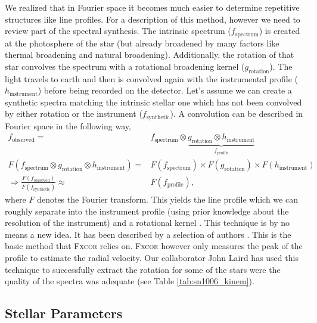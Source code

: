 We realized that in Fourier space it becomes much easier to determine repetitive  structures like line profiles. For a description of this method, however we need to review part of the spectral synthesis. The intrinsic spectrum ($f_\textrm{spectrum}$) is created at the photosphere of the star (but already broadened by many factors like thermal broadening and natural broadening). Additionally, the rotation of that star convolves the spectrum with a rotational broadening kernel ($g_\textrm{rotation}$). The light travels to earth and then is convolved again with the instrumental profile ($h_\textrm{instrument}$) before being recorded on the detector.  Let's assume we can create a synthetic spectra matching the intrinsic stellar one which has not been convolved by either rotation or the instrument ($f_\textrm{synthetic}$). A convolution can be described in Fourier space in the following way,
\begin{align*}
	f_\textrm{observed} =& f_\textrm{spectrum} \otimes \underbrace{g_\textrm{rotation} \otimes h_\textrm{instrument}}_{f_\textrm{profile}}\\
     F(f_\textrm{spectrum} \otimes g_\textrm{rotation} \otimes h_\textrm{instrument}) =& F(f_\textrm{spectrum}) \times F(g_\textrm{rotation}) \times F(h_\textrm{instrument})\\
     \Rightarrow \frac{F(f_\textrm{observed})}{F(f_\textrm{synthetic})} \approx& F(f_\textrm{profile}),
\end{align*}
where $F$ denotes the Fourier transform. This yields the line profile which we can roughly separate into the instrument profile (using prior knowledge about the resolution of the instrument) and a rotational kernel . This technique is by no means a new idea. It has been described by a selection of authors \citep[e.g.][]{1977ApJ...211..198G}. This is the basic method that \textsc{Fxcor} relies on. \textsc{Fxcor} however only measures the peak of the profile to estimate the radial velocity. Our collaborator John Laird has used this technique to successfully extract the rotation for some of the stars were the quality of the spectra was adequate (see Table \ref{tab:sn1006_kinem}).


\subsection{Stellar Parameters}
\label{sec:sn1006_stelparam}

